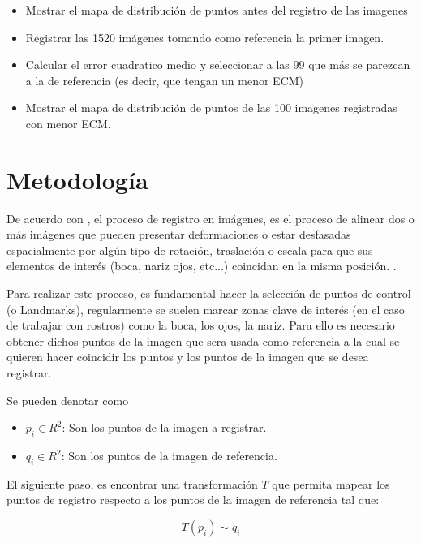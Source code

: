 \documentclass[11pt, letterpaper]{article}
\begin{document}
\begin{itemize}
	\item Mostrar el mapa de distribución de puntos antes del registro de las imagenes
	\item Registrar las 1520 imágenes tomando como referencia la primer imagen.
	\item Calcular el error cuadratico medio y seleccionar a las 99 que más se parezcan a la de referencia (es decir, que tengan un menor ECM)
	\item Mostrar el mapa de distribución de puntos de las 100 imagenes registradas con menor ECM.	
	
\end{itemize}




	
\newpage
	
\section{Metodología}

De acuerdo con \cite{gonzalez2018digital}, el proceso de registro en imágenes, es el proceso de alinear dos o más imágenes que pueden presentar deformaciones o estar desfasadas espacialmente por algún tipo de rotación, traslación o escala para que sus elementos de interés (boca, nariz ojos, etc...) coincidan en la misma posición. .

Para realizar este proceso, es fundamental hacer la selección de puntos de control (o Landmarks), regularmente se suelen marcar zonas clave de interés (en el caso de trabajar con rostros) como la boca, los ojos, la nariz. Para ello es necesario obtener dichos puntos de la imagen que sera usada como referencia a la cual se quieren hacer coincidir los puntos y los puntos de la imagen que se desea registrar.

Se pueden denotar como 

\begin{itemize}
\item $p_i \in R^2$: Son los puntos de la imagen a registrar.
\item $q_i \in R^2$: Son los puntos de la imagen de referencia.
\end{itemize}

El siguiente paso, es encontrar una transformación $T$ que permita mapear los puntos de registro respecto a los puntos de la imagen de referencia tal que:

$$T(p_i)\sim q_i $$
\end{document}
